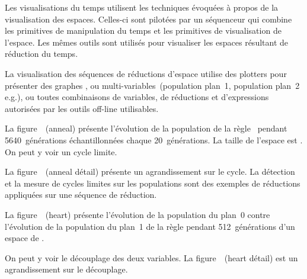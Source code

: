 Les visualisations du temps utilisent les techniques \'evoqu\'ees \`a propos
de la visualisation des espaces. %
Celles-ci sont pilot\'ees par un s\'equenceur qui combine les primitives
de manipulation du temps et les primitives de visualisation de
l'espace. %
Les m\^emes outils sont utilis\'es pour visualiser les espaces r\'esultant
de r\'eduction du temps. %

La visualisation des s\'equences de r\'eductions d'espace utilise des
plotters pour pr\'esenter des graphes , %
ou multi-variables~(population plan~1, population plan~2 e.g.), %
ou toutes combinaisons de variables, de r\'eductions et d'expressions
autoris\'ees par les outils off-line utilisables. %

\noindent%
La figure~~(anneal) pr\'esente
l'\'evolution de la population de la r\`egle~ pendant
5640~g\'en\'erations \'echantillonn\'ees chaque 20~g\'en\'erations. %
La taille de l'espace est . %
On peut y voir un cycle limite. %

\noindent%
La figure~~(anneal d\'etail)
pr\'esente un agrandissement sur le cycle. %
La d\'etection et la mesure de cycles limites sur les populations sont des
exemples de r\'eductions appliqu\'ees sur une s\'equence de r\'eduction. %

\noindent%
La figure~~(heart) pr\'esente
l'\'evolution de la population du plan~0 contre l'\'evolution de la
population du plan~1 de la r\`egle  pendant 512~g\'en\'erations d'un
espace de . %

\noindent%
On peut y voir le d\'ecouplage des deux variables. %
La figure~~(heart d\'etail) est un
agrandissement sur le d\'ecouplage. 

\clearpage

